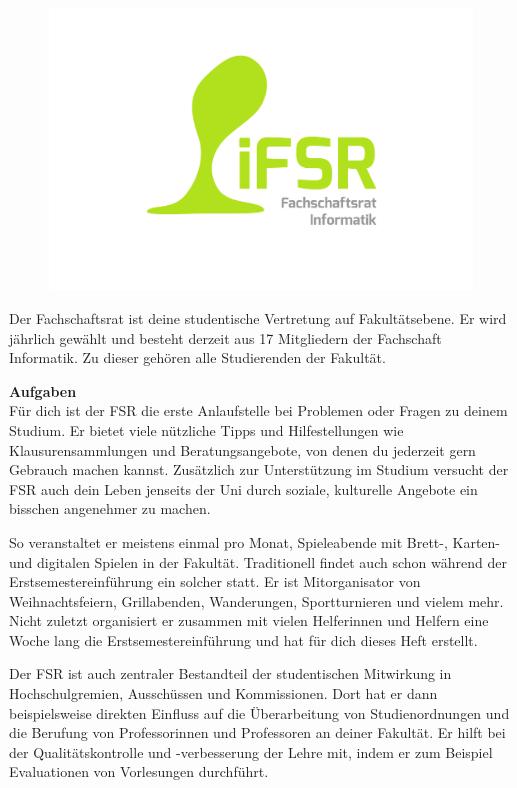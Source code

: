 \newpage

\label{sec:fachschaftsrat}
\begin{figure}\ \\[-1cm]
\flushright\includegraphics[width=\linewidth, trim=160 150 150 50, clip]{img/fsr_logo}
\end{figure}

Der Fachschaftsrat ist deine studentische Vertretung auf Fakultätsebene.
Er wird jährlich gewählt und besteht derzeit aus 17 Mitgliedern der Fachschaft Informatik. Zu dieser gehören alle Studierenden der Fakultät.
 
\textbf{Aufgaben} \\
Für dich ist der FSR die erste Anlaufstelle bei Problemen oder Fragen zu deinem Studium. Er bietet viele nützliche Tipps und Hilfestellungen wie Klausurensammlungen  und Beratungsangebote, von denen du jederzeit gern Gebrauch machen kannst. Zusätzlich zur Unterstützung im Studium versucht der FSR auch dein Leben jenseits der Uni durch soziale, kulturelle Angebote ein bisschen angenehmer zu machen.

So veranstaltet er meistens einmal pro Monat, Spieleabende mit Brett-, Karten- und digitalen Spielen in der Fakultät. Traditionell findet auch schon während der Erstsemestereinführung ein solcher statt. 
Er ist Mitorganisator von Weihnachtsfeiern, Grillabenden, Wanderungen, Sportturnieren und vielem mehr.
Nicht zuletzt organisiert er zusammen mit vielen Helferinnen und Helfern eine Woche lang die Erstsemestereinführung und hat für dich dieses Heft erstellt.

Der FSR ist auch zentraler Bestandteil der studentischen Mitwirkung in Hochschulgremien, Ausschüssen und Kommissionen. 
Dort hat er dann beispielsweise direkten Einfluss auf die Überarbeitung von Studienordnungen und die Berufung von Professorinnen und Professoren an deiner Fakultät. 
Er hilft bei der Qualitätskontrolle und -verbesserung der Lehre mit, indem er zum Beispiel Evaluationen von Vorlesungen durchführt.


